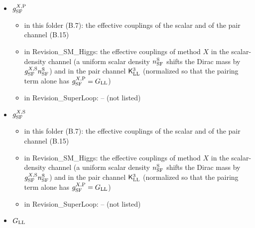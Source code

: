 \documentclass[
  10pt,
]{article}
\providecommand{\tightlist}{%
  \setlength{\itemsep}{0pt}\setlength{\parskip}{0pt}}
\begin{document}
\begin{itemize}
  \begin{itemize}
  \tightlist
  \item
    in this folder (B.7, D): the self-interaction of the brochon model
    (step \(n\) of the recursion of Appendix B.5) and its couplings
  \item
    in Revision\_SM\_Higgs: the couplings of the scalar and of the
    vector contact terms,
    \(\tfrac12G^{\rm S}_{\rm SF}:(\bar\Psi_{\rm LL}\Psi_{\rm LL})^2:\)
    and
    \(\tfrac12G^{\rm V}_{\rm SF}\sum_p\eta^{\rm LL}_{pp}:(j^{{\rm F},p}_{\rm SF})^2:\)
    of the Hamiltonian density, formed after the author's Kohn-Sham
    ansatz of the project (attraction in the scalar density for
    \(G^{\rm S}_{\rm SF}<0\), repulsion of the densities for
    \(G^{\rm V}_{\rm SF}>0\))
  \item
    in Revision\_SuperLoop: -- (not listed)
  \end{itemize}
\item
  \(g^{X,{\rm P}}_{\rm SF}\)

  \begin{itemize}
  \tightlist
  \item
    in this folder (B.7): the effective couplings of the scalar and of
    the pair channel (B.15)
  \item
    in Revision\_SM\_Higgs: the effective couplings of method \(X\) in
    the scalar-density channel (a uniform scalar density
    \(n^{\rm S}_{\rm SF}\) shifts the Dirac mass by
    \(g^{X,{\rm S}}_{\rm SF}n^{\rm S}_{\rm SF}\)) and in the pair
    channel \(\mathsf K^3_{\rm LL}\) (normalized so that the pairing
    term alone has \(g^{X,{\rm P}}_{\rm SF}=G_{\rm LL}\))
  \item
    in Revision\_SuperLoop: -- (not listed)
  \end{itemize}
\item
  \(g^{X,{\rm S}}_{\rm SF}\)

  \begin{itemize}
  \tightlist
  \item
    in this folder (B.7): the effective couplings of the scalar and of
    the pair channel (B.15)
  \item
    in Revision\_SM\_Higgs: the effective couplings of method \(X\) in
    the scalar-density channel (a uniform scalar density
    \(n^{\rm S}_{\rm SF}\) shifts the Dirac mass by
    \(g^{X,{\rm S}}_{\rm SF}n^{\rm S}_{\rm SF}\)) and in the pair
    channel \(\mathsf K^3_{\rm LL}\) (normalized so that the pairing
    term alone has \(g^{X,{\rm P}}_{\rm SF}=G_{\rm LL}\))
  \item
    in Revision\_SuperLoop: -- (not listed)
  \end{itemize}
\item
  \(G_{\rm LL}\)


\end{itemize}
\end{document}
